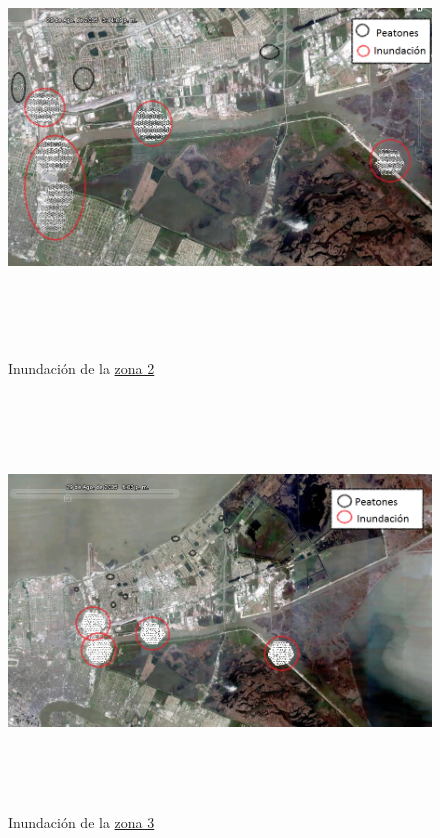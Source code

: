 \begin{figure}[H]
 \centering
 \includegraphics[height=115mm,angle=90]{figuras/cap6/resultados/katrina2.png}
 \caption{Inundación de la \hyperref[zona2]{zona 2}}
\end{figure}

\begin{figure}[H]
 \centering
 \includegraphics[height=110mm,angle=90]{figuras/cap6/resultados/katrina3.png}
 \caption{Inundación de la \hyperref[zona3]{zona 3}}
\end{figure}

